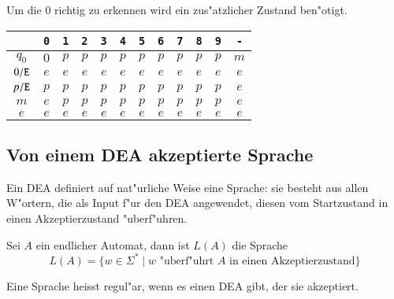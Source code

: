 \begin{beispiel} Um die $0$ richtig zu erkennen
wird ein zus"atzlicher Zustand ben"otigt.

\begin{center}
\begin{tabular}{|c|ccccccccccc|}
\hline
&\tt 0&\tt 1&\tt 2&\tt 3&\tt 4&\tt 5&\tt 6&\tt 7&\tt 8&\tt 9&\tt -\\
\hline
$q_0$&$0$&$p$&$p$&$p$&$p$&$p$&$p$&$p$&$p$&$p$&$m$\\
$0{\tt /E}$&$e$&$e$&$e$&$e$&$e$&$e$&$e$&$e$&$e$&$e$&$e$\\
$p{\tt /E}$&$p$&$p$&$p$&$p$&$p$&$p$&$p$&$p$&$p$&$p$&$e$\\
$m$&$e$&$p$&$p$&$p$&$p$&$p$&$p$&$p$&$p$&$p$&$e$\\
$e$&$e$&$e$&$e$&$e$&$e$&$e$&$e$&$e$&$e$&$e$&$e$\\
\hline
\end{tabular}
\end{center}

\end{beispiel}

\subsection{Von einem DEA akzeptierte Sprache\label{regulaer:akzeptiertesprache}}
Ein DEA definiert auf nat"urliche Weise eine Sprache: sie besteht aus
allen W"ortern, die als Input f"ur den DEA angewendet, diesen vom
Startzustand in einen Akzeptierzustand "uberf"uhren.

\begin{definition}
Sei $A$ ein endlicher Automat, dann ist $L(A)$ die Sprache
\[
L(A)=\{w\in\Sigma^*\;|\; \text{$w$ "uberf"uhrt $A$ in einen Akzeptierzustand}\}
\]
\end{definition}

\begin{definition}
\label{regulaer:definition:regulaere-sprache}
Eine Sprache heisst regul"ar, wenn es einen DEA gibt, der sie
akzeptiert.
\end{definition}

